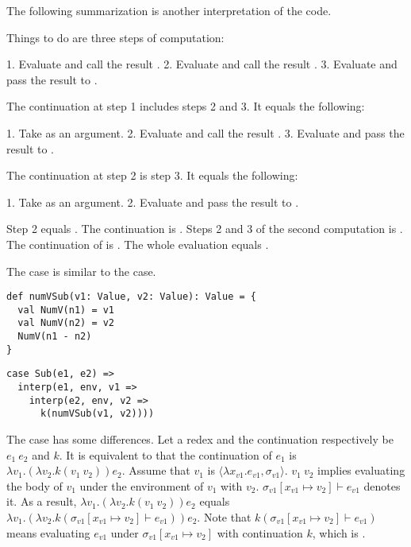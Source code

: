 The following summarization is another interpretation of the code.

Things to do are three steps of computation:

1. Evaluate  and call the result .
2. Evaluate  and call the result .
3. Evaluate  and pass the result to .

The continuation at step 1 includes steps 2 and 3. It equals the following:

1. Take  as an argument.
2. Evaluate  and call the result .
3. Evaluate  and pass the result to .

The continuation at step 2 is step 3. It equals the following:

1. Take  as an argument.
2. Evaluate  and pass the result to .

Step 2 equals . The continuation is . Steps 2 and 3 of the second computation is . The continuation of  is . The whole evaluation equals
.

The  case is similar to the  case.

\begin{verbatim}
def numVSub(v1: Value, v2: Value): Value = {
  val NumV(n1) = v1
  val NumV(n2) = v2
  NumV(n1 - n2)
}
\end{verbatim}

\begin{verbatim}
case Sub(e1, e2) =>
  interp(e1, env, v1 =>
    interp(e2, env, v2 =>
      k(numVSub(v1, v2))))
\end{verbatim}

The  case has some differences. Let a redex and the continuation
respectively be $e_1\ e_2$ and $k$. It is equivalent to that the continuation of
$e_1$ is $\lambda v_1.(\lambda v_2.k(v_1\ v_2))e_2$. Assume that $v_1$ is
$\langle\lambda x_{v1}.e_{v1},\sigma_{v1}\rangle$. $v_1\ v_2$ implies evaluating
the body of $v_1$ under the environment of $v_1$ with $v_2$.
$\sigma_{v1}[x_{v1}\mapsto v_2]\vdash e_{v1}$ denotes it. As a result, $\lambda
v_1.(\lambda v_2.k(v_1\ v_2))e_2$ equals $\lambda v_1.(\lambda
v_2.k(\sigma_{v1}[x_{v1}\mapsto v_2]\vdash e_{v1}))e_2$. Note that
$k(\sigma_{v1}[x_{v1}\mapsto v_2]\vdash e_{v1})$ means evaluating $e_{v1}$ under
$\sigma_{v1}[x_{v1}\mapsto v_2]$ with continuation $k$, which is
.

